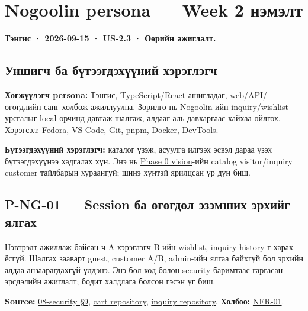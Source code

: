 \section{Nogoolin persona --- Week 2
нэмэлт}\label{doc2-nogoolin-persona-week-2-ux43dux44dux43cux44dux43bux442}

\textbf{Тэнгис · 2026-09-15 · US-2.3 · Өөрийн ажиглалт.}

\subsection{Уншигч ба бүтээгдэхүүний
хэрэглэгч}\label{doc2-ux443ux43dux448ux438ux433ux447-ux431ux430-ux431ux4afux442ux44dux44dux433ux434ux44dux445ux4afux4afux43dux438ux439-ux445ux44dux440ux44dux433ux43bux44dux433ux447}

\textbf{Хөгжүүлэгч persona:} Тэнгис, TypeScript/React ашигладаг,
web/API/өгөгдлийн санг холбож ажиллуулна. Зорилго нь Nogoolin-ийн
inquiry/wishlist урсгалыг local орчинд давтаж шалгаж, алдааг аль
давхаргаас хайхаа ойлгох. Хэрэгсэл: Fedora, VS Code, Git, pnpm, Docker,
DevTools.

\textbf{Бүтээгдэхүүний хэрэглэгч:} каталог үзэж, асуулга илгээх эсвэл
дараа үзэх бүтээгдэхүүнээ хадгалах хүн. Энэ нь
\href{../../phase-0/01-vision.md}{Phase 0 vision}-ийн catalog
visitor/inquiry customer тайлбарын хураангуй; шинэ хүнтэй ярилцсан үр
дүн биш.

\subsection{P-NG-01 --- Session ба өгөгдөл эзэмших эрхийг
ялгах}\label{doc2-p-ng-01-session-ux431ux430-ux4e9ux433ux4e9ux433ux434ux4e9ux43b-ux44dux437ux44dux43cux448ux438ux445-ux44dux440ux445ux438ux439ux433-ux44fux43bux433ux430ux445}

Нэвтрэлт ажиллаж байсан ч A хэрэглэгч B-ийн wishlist, inquiry history-г
харах ёсгүй. Шалгах зааварт guest, customer A/B, admin-ийн ялгаа байхгүй
бол эрхийн алдаа анзаарагдахгүй үлдэнэ. Энэ бол код болон security
баримтаас гаргасан эрсдэлийн ажиглалт; бодит халдлага болсон гэсэн үг
биш.

\textbf{Source:}
\href{../../phase-0/08-security.md\#9-idor-prevention}{08-security §9},
\href{../../../backend/api/src/repositories/supabase/cart.repository.ts}{cart
repository},
\href{../../../backend/api/src/repositories/supabase/inquiry.repository.ts}{inquiry
repository}. \textbf{Холбоо:}
\href{../../requirements/requirements.md\#nfr-01}{NFR-01}.

